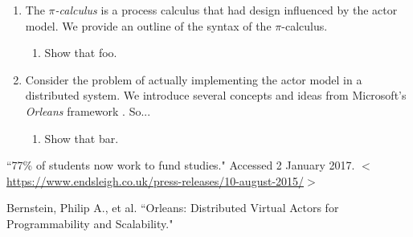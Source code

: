 \documentclass[12pt, a4paper]{article}
\begin{document}
\begin{enumerate}
\item The \textit{$\pi$-calculus} is a process calculus that had design influenced
by the actor model. We provide an outline of the syntax of the $\pi$-calculus.

\begin{enumerate}
\item Show that foo.
\end{enumerate}

\item Consider the problem of actually implementing the actor model in a distributed
system. We introduce several concepts and ideas from Microsoft's \textit{Orleans} 
framework \cite{orleans}. So...

\begin{enumerate}
\item Show that bar.
\end{enumerate}

\end{enumerate}



\newpage
\begin{thebibliography}{9}
``77\% of students now work to fund studies." Accessed 2 January 2017. $<$\url{https://www.endsleigh.co.uk/press-releases/10-august-2015/}$>$

Bernstein, Philip A., et al. ``Orleans: Distributed Virtual Actors for Programmability and Scalability."

\end{thebibliography}
\end{document}
